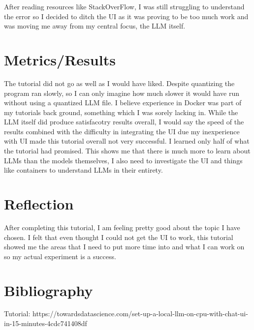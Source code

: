 \documentclass{article}
\begin{document}
After reading resources like StackOverFlow, I was still struggling to understand the error so I decided to ditch the UI as it was proving to be too much work and was moving me away from my central focus, the LLM itself.

\section{Metrics/Results}
The tutorial did not go as well as I would have liked. Despite quantizing the program ran slowly, so I can only imagine how much slower it would have run without using a quantized LLM file. I believe experience in Docker was part of my tutorials back ground, something which I was sorely lacking in. While the LLM itself did produce satisfacotry results overall, I would say the speed of the results combined with the difficulty in integrating the UI due my inexperience with UI made this tutorial overall not very successful. I learned only half of what the tutorial had promised. This shows me that there is much more to learn about LLMs than the models themselves, I also need to investigate the UI and things like containers to understand LLMs in their entirety.

\section{Reflection}
After completing this tutorial, I am feeling pretty good about the topic I have chosen. I felt that even thought I could not get the UI to work, this tutorial showed me the areas that I need to put more time into and what I can work on so my actual experiment is a success.

\section{Bibliography}
Tutorial: https://towardsdatascience.com/set-up-a-local-llm-on-cpu-with-chat-ui-in-15-minutes-4cdc741408df
\end{document}
